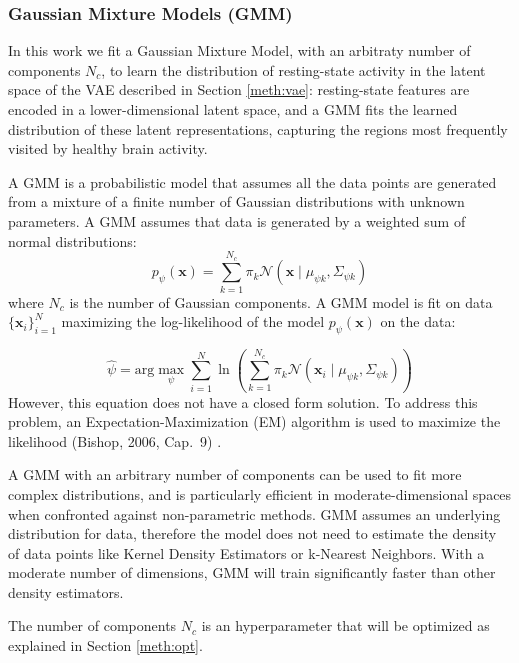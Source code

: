 \subsubsection{Gaussian Mixture Models (GMM)}  \label{meth:gmm}

In this work we fit a Gaussian Mixture Model, with an arbitraty number of 
components $N_c$, to learn the distribution of resting-state activity in the
latent space of the VAE described in Section \ref{meth:vae}:
resting-state features are encoded in a lower-dimensional latent space, and a
GMM fits the learned distribution of these latent representations, capturing the
regions most frequently visited by healthy brain activity.

A GMM is a probabilistic model that assumes all the data
points are generated from a mixture of a finite number of Gaussian distributions
with unknown parameters.
A GMM assumes that data is generated by a weighted sum of normal distributions:
\begin{equation}
    p_\psi(\mathbf{x}) = \sum_{k=1}^{N_c}\pi_k\mathcal{N}
    (\mathbf{x} \mid \mu_{\psi k}, \Sigma_{\psi k})
\end{equation}
where $N_c$ is the number of Gaussian components.
A GMM model is fit on data $\{\mathbf{x}_i\}_{i=1}^N$ maximizing the
log-likelihood of the model $p_\psi(\mathbf{x})$ on the data:

\begin{equation}
    \hat{\psi} = \text{arg}\max_{\psi}\sum_{i=1}^N
    \ln\left(\sum_{k=1}^{N_c}\pi_k\mathcal{N}
    (\mathbf{x}_i \mid \mu_{\psi k}, \Sigma_{\psi k})\right)
\end{equation}
However, this equation does not have a closed form solution.
To address this problem,
an Expectation-Maximization (EM) algorithm is used to maximize the likelihood 
(Bishop, 2006, Cap.~9) \cite{bishop2006}.

A GMM with an arbitrary number of components can be used to fit more complex
distributions, and is particularly efficient in moderate-dimensional spaces
when confronted against non-parametric methods.
GMM assumes an underlying distribution for data, therefore the model does not
need to estimate the density of data points like Kernel Density Estimators or
k-Nearest Neighbors.
With a moderate number of dimensions, GMM will train significantly faster than
other density estimators.

The number of components $N_c$ is an hyperparameter that will be optimized as
explained in Section \ref{meth:opt}.

